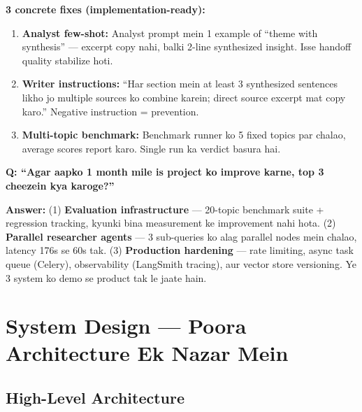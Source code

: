 \begin{codestorybox}
\textbf{3 concrete fixes (implementation-ready):}

\begin{enumerate}[label=\arabic*.]
\item \textbf{Analyst few-shot:} Analyst prompt mein 1 example of ``theme with synthesis'' --- excerpt copy nahi, balki 2-line synthesized insight. Isse handoff quality stabilize hoti.
\item \textbf{Writer instructions:} ``Har section mein at least 3 synthesized sentences likho jo multiple sources ko combine karein; direct source excerpt mat copy karo.'' Negative instruction = prevention.
\item \textbf{Multi-topic benchmark:} Benchmark runner ko 5 fixed topics par chalao, average scores report karo. Single run ka verdict basura hai.
\end{enumerate}
\end{codestorybox}

\begin{interviewbox}
\textbf{Q: ``Agar aapko 1 month mile is project ko improve karne, top 3 cheezein kya karoge?''}

\textbf{Answer:} (1) \textbf{Evaluation infrastructure} --- 20-topic benchmark suite + regression tracking, kyunki bina measurement ke improvement nahi hota. (2) \textbf{Parallel researcher agents} --- 3 sub-queries ko alag parallel nodes mein chalao, latency 176s se 60s tak. (3) \textbf{Production hardening} --- rate limiting, async task queue (Celery), observability (LangSmith tracing), aur vector store versioning. Ye 3 system ko demo se product tak le jaate hain.
\end{interviewbox}

\section{System Design --- Poora Architecture Ek Nazar Mein}

\subsection{High-Level Architecture}

